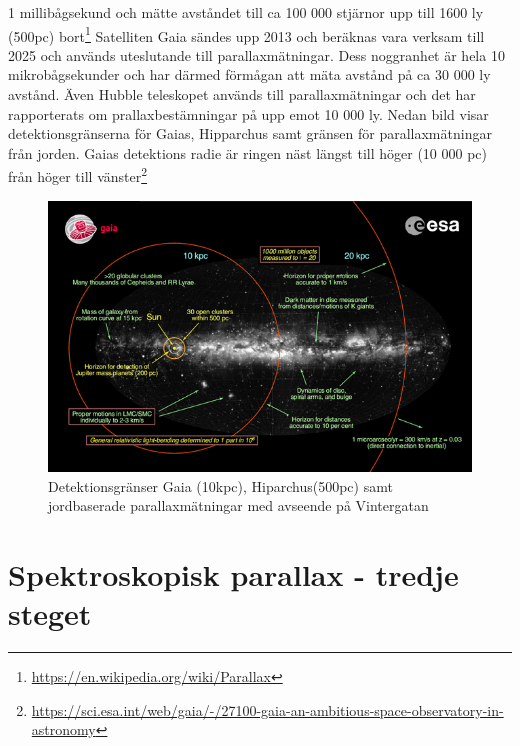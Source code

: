 \documentclass[./exercises.tex]{subfiles}
\begin{document}
1 millibågsekund och mätte avståndet till ca 100 000 stjärnor upp till 1600 ly (500pc) bort\footnote{\url{https://en.wikipedia.org/wiki/Parallax}}
Satelliten Gaia sändes upp 2013 och beräknas vara verksam till 2025 och används uteslutande till parallaxmätningar.
Dess noggranhet är hela 10 mikrobågsekunder och har därmed förmågan att mäta avstånd på ca 30 000 ly avstånd.
Även Hubble teleskopet används till parallaxmätningar och det har rapporterats om prallaxbestämningar på upp emot
10 000 ly.
Nedan bild visar detektionsgränserna för Gaias, Hipparchus samt gränsen för parallaxmätningar från jorden.
Gaias detektions radie är ringen näst längst till höger (10 000 pc)
från höger till vänster\footnote{\url{https://sci.esa.int/web/gaia/-/27100-gaia-an-ambitious-space-observatory-in-astronomy}}
\begin{figure}[H]
\begin{center}
  \includegraphics[width=\linewidth]{Gaia.jpg}
  \caption{Detektionsgränser Gaia (10kpc), Hiparchus(500pc) samt jordbaserade parallaxmätningar med avseende på Vintergatan}
  \end{center}
  \label{fig4}
\end{figure}

\section{Spektroskopisk parallax - tredje steget}
\end{document}
